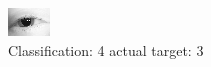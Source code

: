 \begin{figure}[h!]
\begin{center}
\includegraphics[width=0.60\columnwidth]{figures/ID34_class_4_target_3.png}
\end{center}
\caption{ Classification: 4 actual target: 3}
\label{fig:ID34_class_4_target_3}
\end{figure}
